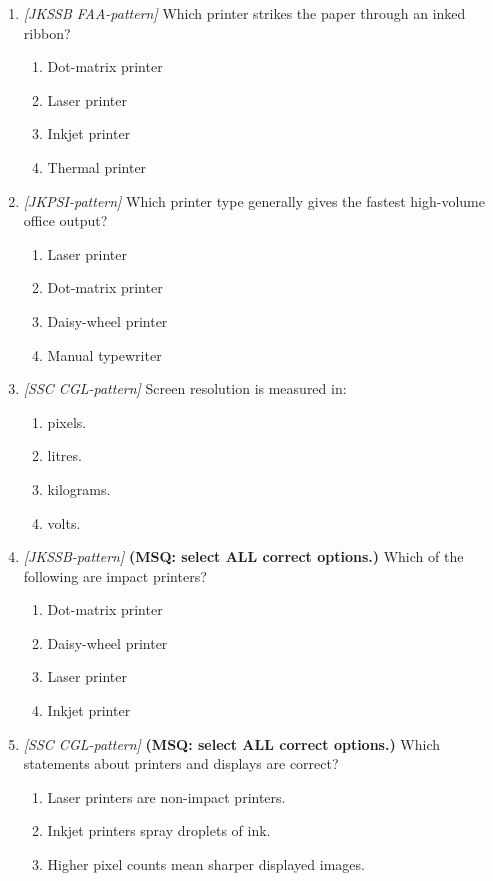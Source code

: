 \begin{enumerate}[label=\textbf{Q\arabic*.}, leftmargin=*]
\item \textit{[JKSSB FAA-pattern]} Which printer strikes the paper through an inked ribbon?
  \begin{enumerate}[label=\Alph*.]
    \item Dot-matrix printer
    \item Laser printer
    \item Inkjet printer
    \item Thermal printer
  \end{enumerate}
\item \textit{[JKPSI-pattern]} Which printer type generally gives the fastest high-volume office output?
  \begin{enumerate}[label=\Alph*.]
    \item Laser printer
    \item Dot-matrix printer
    \item Daisy-wheel printer
    \item Manual typewriter
  \end{enumerate}
\item \textit{[SSC CGL-pattern]} Screen resolution is measured in:
  \begin{enumerate}[label=\Alph*.]
    \item pixels.
    \item litres.
    \item kilograms.
    \item volts.
  \end{enumerate}
\item \textit{[JKSSB-pattern]} \textbf{(MSQ: select ALL correct options.)} Which of the following are impact printers?
  \begin{enumerate}[label=\Alph*.]
    \item Dot-matrix printer
    \item Daisy-wheel printer
    \item Laser printer
    \item Inkjet printer
  \end{enumerate}
\item \textit{[SSC CGL-pattern]} \textbf{(MSQ: select ALL correct options.)} Which statements about printers and displays are correct?
  \begin{enumerate}[label=\Alph*.]
    \item Laser printers are non-impact printers.
    \item Inkjet printers spray droplets of ink.
    \item Higher pixel counts mean sharper displayed images.

\end{enumerate}
\end{enumerate}
